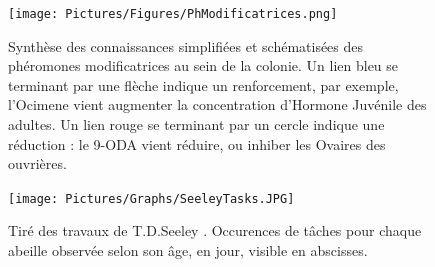 			
			
			
			\begin{figure}
			\centering
				\texttt{[image: Pictures/Figures/PhModificatrices.png]}
				\caption{Synthèse des connaissances simplifiées et schématisées des phéromones modificatrices au sein de la colonie. Un lien bleu se terminant par une flèche indique un renforcement, par exemple, l'Ocimene vient augmenter la concentration d'Hormone Juvénile des adultes. Un lien rouge se terminant par un cercle indique une réduction : le 9-ODA vient réduire, ou inhiber les Ovaires des ouvrières.}
				\label{phMod}
			\end{figure}	
			
			\begin{figure}
			\centering
				\texttt{[image: Pictures/Graphs/SeeleyTasks.JPG]}
				\caption{Tiré des travaux de T.D.Seeley \cite{seeley_wisdom_1995}. Occurences de tâches pour chaque abeille observée selon son âge, en jour, visible en abscisses.}
				\label{SeeleyTasks}
			\end{figure}	
			
